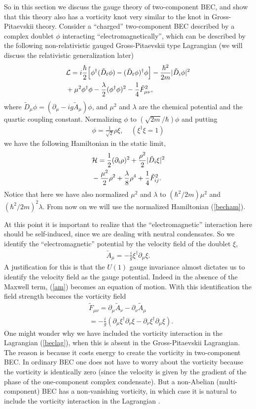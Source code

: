 \documentclass[twocolumn,showpacs,showkeys]{revtex4}
\newcommand{\bea}{\begin{eqnarray}}
\newcommand{\eea}{\end{eqnarray}}
\newcommand{\pro}{\partial}
\newcommand{\dfrac}{\displaystyle\frac}
\newcommand{\nn}{\nonumber}
\begin{document}
So in this section we discuss the gauge theory of two-component BEC,
and show that this theory also has a vorticity knot very similar 
to the knot in Gross-Pitaevskii theory. 
Consider a ``charged'' two-component BEC
described by a complex doublet $\phi$ interacting
``electromagnetically'', which can be described by the following
non-relativistic gauged Gross-Pitaevskii type Lagrangian (we
will discuss the relativistic generalization later)
\bea
&{\cal L} = i \dfrac {\hbar}{2} \Big[\phi^\dag (\tilde D_t \phi)
-(\tilde D_t \phi)^\dag \phi \Big] 
-  \dfrac {\hbar^2}{2m} |\tilde D_i \phi|^2 \nn\\
& + \mu^2 \phi^\dag \phi - \dfrac {\lambda}{2}
(\phi^\dag \phi)^2 - \dfrac {1}{4} \tilde F_{\mu \nu} ^2,
\label{beclag}
\eea
where $\tilde D_\mu \phi = ( \pro_\mu - i g \tilde A_\mu ) \phi$,
and $\mu^2$ and $\lambda$ are the chemical potential 
and the quartic coupling constant.
Normalizing $\phi$ to $(\sqrt{2m}/\hbar)\phi$ and putting
\bea
\phi = \dfrac {1}{\sqrt 2} \rho \xi , ~~~~~(\xi^\dag \xi = 1)
\eea
we have the following Hamiltonian in the static limit,
\bea
&{\cal H} =  \dfrac {1}{2} (\pro_i \rho)^2
+ \dfrac {\rho^2}{2} |\tilde D_i \xi |^2 \nn \\
&- \dfrac {\mu^2}{2} \rho^2 + \dfrac{\lambda}{8} \rho^4
+ \dfrac {1}{4} \tilde F_{ij} ^2.
\label{becham}
\eea
Notice that here we have also
normalized $\mu^2$ and $\lambda$ to
$(\hbar^2/2m) \mu^2$ and $(\hbar^2/2m)^2 \lambda$.
From now on we will use the normalized Hamiltonian (\ref{becham}).

At this point it is important to realize that the ``electromagnetic''
interaction here should be self-induced, since we are dealing
with neutral condensates. So we identify
the ``electromagnetic'' potential by the velocity field of
the doublet $\xi$,
\bea
\tilde A_\mu = -\dfrac {i}{g} \xi^\dag \pro_\mu \xi.
\label{am}
\eea
A justification for this is that the $U(1)$ gauge invariance almost
dictates us to identify the velocity field as the gauge potential.
Indeed in the absence of the Maxwell term, (\ref{am}) becomes 
an equation of motion. With this identification 
the field strength becomes the vorticity field
\bea
&\tilde F_{\mu\nu} = \pro_\mu \tilde A_\nu - \pro_\nu \tilde A_\mu \nn\\
&= -\dfrac {i}{g} (\pro_\mu \xi^\dag \pro_\nu \xi
- \pro_\nu \xi^\dag \pro_\mu \xi).
\label{fmn}
\eea
One might wonder why we have included 
the vorticity interaction in the Lagrangian (\ref{beclag}), 
when this is absent in the Gross-Pitaevskii Lagrangian. 
The reason is because it costs energy to create
the vorticity in two-component BEC. In ordinary BEC one does
not have to worry about the vorticity because the vorticity is identically
zero (since the velocity is given by the gradient of the phase
of the one-component complex condensate). But a non-Abelian
(multi-component) BEC has a non-vanishing vorticity,
in which case it is natural to include
the vorticity interaction in the Lagrangian \cite{bec1,bec5}. 
\end{document}
